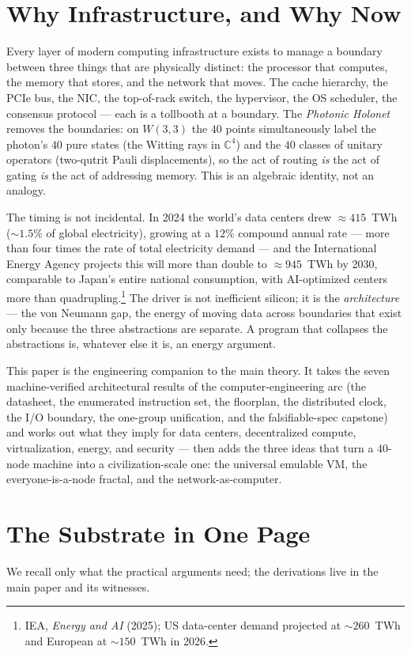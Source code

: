 \documentclass[11pt]{article}
\begin{document}
\tableofcontents

\section{Why Infrastructure, and Why Now}
Every layer of modern computing infrastructure exists to manage a boundary between three things that
are physically distinct: the processor that computes, the memory that stores, and the network that
moves. The cache hierarchy, the PCIe bus, the NIC, the top-of-rack switch, the hypervisor, the OS
scheduler, the consensus protocol --- each is a tollbooth at a boundary. The \emph{Photonic Holonet}
removes the boundaries: on $W(3,3)$ the $40$ points simultaneously label the photon's $40$ pure states
(the Witting rays in $\mathbb{C}^4$) and the $40$ classes of unitary operators (two-qutrit Pauli
displacements), so the act of routing \emph{is} the act of gating \emph{is} the act of addressing
memory. This is an algebraic identity, not an analogy.

The timing is not incidental. In 2024 the world's data centers drew $\approx 415$~TWh ($\sim 1.5\%$ of
global electricity), growing at a $12\%$ compound annual rate --- more than four times the rate of
total electricity demand --- and the International Energy Agency projects this will more than double to
$\approx 945$~TWh by 2030, comparable to Japan's entire national consumption, with AI-optimized centers
more than quadrupling.\footnote{IEA, \emph{Energy and AI} (2025); US data-center demand projected at
$\sim 260$~TWh and European at $\sim 150$~TWh in 2026.} The driver is not inefficient silicon; it is
the \emph{architecture} --- the von Neumann gap, the energy of moving data across boundaries that exist
only because the three abstractions are separate. A program that collapses the abstractions is, whatever
else it is, an energy argument.

This paper is the engineering companion to the main theory. It takes the seven machine-verified
architectural results of the computer-engineering arc (the datasheet, the enumerated instruction set,
the floorplan, the distributed clock, the I/O boundary, the one-group unification, and the
falsifiable-spec capstone) and works out what they imply for data centers, decentralized compute,
virtualization, energy, and security --- then adds the three ideas that turn a $40$-node machine into a
civilization-scale one: the universal emulable VM, the everyone-is-a-node fractal, and the
network-as-computer.

\section{The Substrate in One Page}
\label{sec:precis}
We recall only what the practical arguments need; the derivations live in the main paper and its
witnesses.
\end{document}
